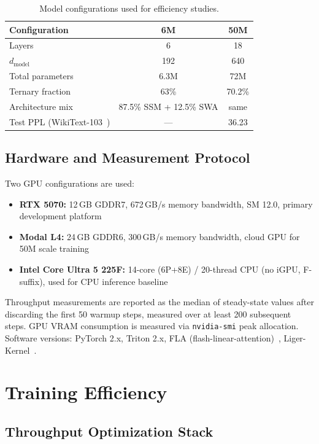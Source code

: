\documentclass{article}
\begin{document}
\begin{table}[t]
\centering
\small
\caption{Model configurations used for efficiency studies.}
\label{tab:models}
\begin{tabular}{lcc}
\toprule
\textbf{Configuration} & \textbf{6M} & \textbf{50M} \\
\midrule
Layers & 6 & 18 \\
$d_{\text{model}}$ & 192 & 640 \\
Total parameters & 6.3M & 72M \\
Ternary fraction & 63\% & 70.2\% \\
Architecture mix & 87.5\% SSM + 12.5\% SWA & same \\
Test PPL (WikiText-103~\citep{merity2017pointer}) & --- & 36.23 \\
\bottomrule
\end{tabular}
\end{table}

\subsection{Hardware and Measurement Protocol}

Two GPU configurations are used:

\begin{itemize}
\item \textbf{RTX 5070:} 12\,GB GDDR7, 672\,GB/s memory bandwidth, SM 12.0, primary development platform
\item \textbf{Modal L4:} 24\,GB GDDR6, 300\,GB/s memory bandwidth, cloud GPU for 50M scale training
\item \textbf{Intel Core Ultra 5 225F:} 14-core (6P+8E) / 20-thread CPU (no iGPU, F-suffix), used for CPU inference baseline
\end{itemize}

Throughput measurements are reported as the median of steady-state values after discarding the first 50 warmup steps, measured over at least 200 subsequent steps. GPU VRAM consumption is measured via \texttt{nvidia-smi} peak allocation. Software versions: PyTorch 2.x, Triton 2.x, FLA (flash-linear-attention)~\citep{yang2024fla}, Liger-Kernel~\citep{hsu2024liger}.

\section{Training Efficiency}

\subsection{Throughput Optimization Stack}
\end{document}
